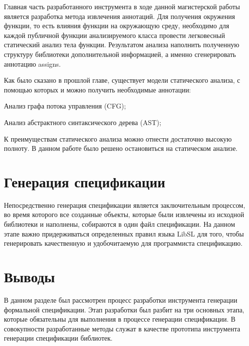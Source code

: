 Главная часть разработанного инструмента в ходе данной магистерской работы является разработка метода извлечения аннотаций.
Для получения окружения функции, то есть влияния функции на окружающую среду, необходимо для каждой публичной функции анализируемого класса провести легковесный статический анализ тела функции.
Результатом анализа наполнить полученную структуру библиотеки дополнительной информацией, а именно сгенерировать аннотацию assigns.

Как было сказано в прошлой главе, существует модели статического анализа, с помощью которых и можно получить необходимые аннотации:
%
\begin{itemize*}
\item Анализ графа потока управления (CFG);
\item Анализ абстрактного синтаксического дерева (AST);
\end{itemize*}
%
К преимуществам статического анализа можно отнести достаточно высокую полноту.
В данном работе было решено остановиться на статическом анализе.

\section{Генерация спецификации}

Непосредственно генерация спецификации является заключительным процессом, во время которого все созданные объекты, которые были извлечены из исходной библиотеки и наполнены, собираются в один файл спецификации.
На данном этапе важно придерживаться определенных правил языка LibSL для того, чтобы генерировать качественную и удобочитаемую для программиста спецификацию.

\section{Выводы}

В данном разделе был рассмотрен процесс разработки инструмента генерации формальной спецификации. Этап разработки был разбит на три основных этапа, которые обязательны для выполнения в процессе генерации спецификации.
В совокупности разработанные методы служат в качестве прототипа инструмента генерации спецификации библиотек.